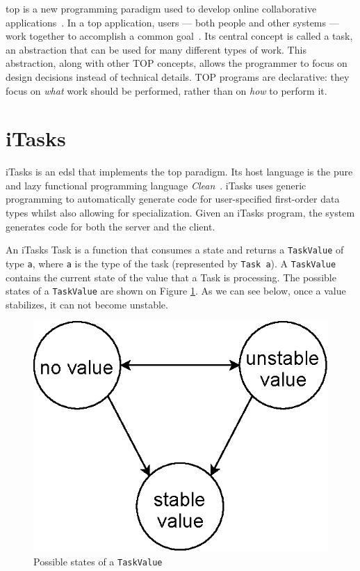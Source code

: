 \acf{top} is a new programming paradigm used to develop online collaborative applications~\cite{top}. In a \acs{top} application, users --- both people and other systems --- work together to accomplish a common goal~\cite{top}. Its central concept is called a task, an abstraction that can be used for many different types of work. This abstraction, along with other TOP concepts, allows the programmer to focus on design decisions instead of technical details. TOP programs are declarative: they focus on \textit{what} work should be performed, rather than on \textit{how} to perform it.

\section{iTasks}\label{itasks}
iTasks is an \acs{edsl} that implements the \acs{top} paradigm. Its host language is the pure and lazy functional programming language \textit{Clean}~\cite{clean}. iTasks uses generic programming to automatically generate code for user-specified first-order data types whilst also allowing for specialization. Given an iTasks program, the system generates code for both the server and the client.

An iTasks Task is a function that consumes a state and returns a \texttt{TaskValue} of type \texttt{a}, where \texttt{a} is the type of the task (represented by \texttt{Task a}). A \texttt{TaskValue} contains the current state of the value that a Task is processing. The possible states of a \texttt{TaskValue} are shown on Figure \ref{fig:task_value}. As we can see below, once a value stabilizes, it can not become unstable.


\begin{figure}[H]
\begin{center}
\includegraphics[scale=0.7]{thesis/img/task_value.eps}
\end{center}
\caption{Possible states of a \texttt{TaskValue}}
\label{fig:task_value}
\end{figure}

